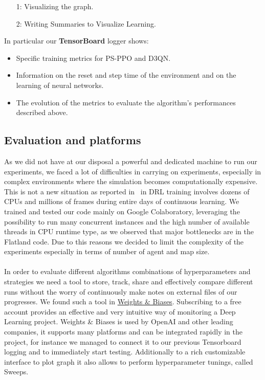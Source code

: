 \documentclass[11pt, a4paper, hidelinks]{report}
\begin{document}
\begin{enumerate}
\item [1:]Visualizing the graph.
\item [2:]Writing Summaries to Visualize Learning.
\end{enumerate}

In particular our \textbf{TensorBoard} logger shows:

\begin{itemize}
	\item Specific training metrics for PS-PPO and D3QN\@.
	\item Information on the reset and step time of the environment and on the learning of neural networks.
	\item The evolution of the metrics to evaluate the algorithm's performances described above.
\end{itemize}

\subsection{Evaluation and platforms}\label{subsec:evaluation-and-platforms}

As we did not have at our disposal a powerful and dedicated machine to run our experiments, we faced a lot of difficulties in carrying on experiments, especially in complex environments where the simulation becomes computationally expensive.
This is not a new situation as reported in~\citep{Hernandez-Leal-2019} in DRL training involves dozens of CPUs and millions of frames during entire days of continuous learning.
We trained and tested our code mainly on Google Colaboratory, leveraging the possibility to run many concurrent instances and the high number of available threads in CPU runtime type, as we observed that major bottlenecks are in the Flatland code.
Due to this reasons we decided to limit the complexity of the experiments especially in terms of number of agent and map size.\\%
\\
In order to evaluate different algorithms combinations of hyperparameters and strategies we need a tool to store, track, share and effectively compare different runs without the worry of continuously make notes on external files of our progresses.
We found such a tool in \href{https://www.wandb.com/}{Weights \& Biases}.
Subscribing to a free account provides an effective and very intuitive way of monitoring a Deep Learning project.
Weights \& Biases is used by OpenAI and other leading companies, it supports many platforms and can be integrated rapidly in the project, for instance we managed to connect it to our previous Tensorboard logging and to immediately start testing.
Additionally to a rich customizable interface to plot graph it also allows to perform hyperparameter tunings, called Sweeps.
\end{document}
